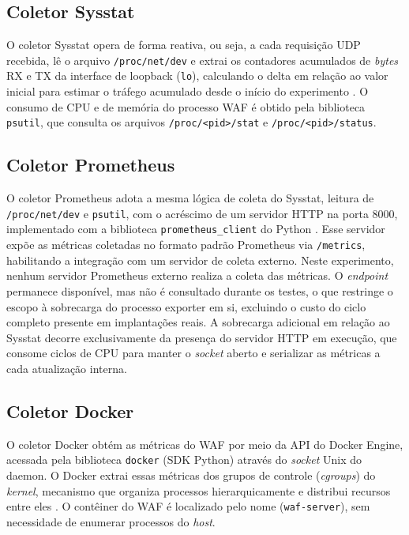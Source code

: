 \subsection{Coletor Sysstat}

O coletor Sysstat opera de forma reativa, ou seja, a cada requisição UDP recebida, lê o arquivo \texttt{/proc/net/dev} e extrai os contadores acumulados de \textit{bytes} RX e TX da interface de loopback (\texttt{lo}), calculando o delta em relação ao valor inicial para estimar o tráfego acumulado desde o início do experimento \cite{godard2024sysstat}. O consumo de CPU e de memória do processo WAF é obtido pela biblioteca \texttt{psutil}, que consulta os arquivos \texttt{/proc/<pid>/stat} e \texttt{/proc/<pid>/status}.

\subsection{Coletor Prometheus}

O coletor Prometheus adota a mesma lógica de coleta do Sysstat, leitura de \texttt{/proc/\linebreak[0]net/dev} e \texttt{psutil}, com o acréscimo de um servidor HTTP na porta 8000, implementado com a biblioteca \texttt{prometheus\_client} do Python \cite{turnbull_prometheus_2018}. Esse servidor expõe as métricas coletadas no formato padrão Prometheus via \texttt{/metrics}, habilitando a integração com um servidor de coleta externo. Neste experimento, nenhum servidor Prometheus externo realiza a coleta das métricas. O \textit{endpoint} permanece disponível, mas não é consultado durante os testes, o que restringe o escopo à sobrecarga do processo exporter em si, excluindo o custo do ciclo completo presente em implantações reais. A sobrecarga adicional em relação ao Sysstat decorre exclusivamente da presença do servidor HTTP em execução, que consome ciclos de CPU para manter o \textit{socket} aberto e serializar as métricas a cada atualização interna.

\subsection{Coletor Docker}
\label{subsec:coletor_docker}

O coletor Docker obtém as métricas do WAF por meio da API do Docker Engine, acessada pela biblioteca \texttt{docker} (SDK Python) através do \textit{socket} Unix do daemon. O Docker extrai essas métricas dos grupos de controle (\textit{cgroups}) do \textit{kernel}, mecanismo que organiza processos hierarquicamente e distribui recursos entre eles \cite{kernel_cgroup_v2, docker_runmetrics}. O contêiner do WAF é localizado pelo nome (\texttt{waf-server}), sem necessidade de enumerar processos do \textit{host}.


